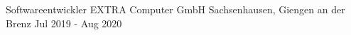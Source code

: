 
\begin{cventries}
  \cventry
    {Softwareentwickler} %
    {EXTRA Computer GmbH} %
    {Sachsenhausen, Giengen an der Brenz} %
    {Jul 2019 - Aug 2020} %
    {
    }




\end{cventries}
